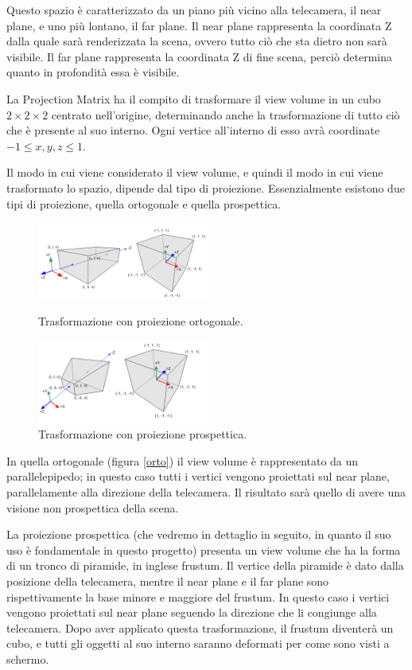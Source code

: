 Questo spazio è caratterizzato da un piano più vicino alla telecamera, il near plane, e uno più lontano, il far plane. Il near plane rappresenta la coordinata Z dalla quale sarà renderizzata la scena, ovvero tutto ciò che sta dietro non sarà visibile. Il far plane rappresenta la coordinata Z di fine scena, perciò determina quanto in profondità essa è visibile.

La Projection Matrix ha il compito di trasformare il view volume in un cubo $2 \times 2\times 2$ centrato nell'origine, determinando anche la trasformazione di tutto ciò che è presente al suo interno. Ogni vertice all'interno di esso avrà coordinate $-1\leq x,y,z \leq 1$.

Il modo in cui viene considerato il view volume, e quindi il modo in cui viene trasformato lo spazio, dipende dal tipo di proiezione. Essenzialmente esistono due tipi di proiezione, quella ortogonale e quella prospettica.

\begin{figure}[htbp]
\centering
\includegraphics[width=0.5\textwidth]{images/frustum/orto-projection.png}
\caption{Trasformazione con proiezione ortogonale.\label{orto}}
\includegraphics[width=0.5\textwidth]{images/frustum/persp-projection.png}
\caption{Trasformazione con proiezione prospettica.\label{persp}}
\end{figure}

In quella ortogonale (figura \ref{orto}) il view volume è rappresentato da un parallelepipedo; in questo caso tutti i vertici vengono proiettati sul near plane, parallelamente alla direzione della telecamera. Il risultato sarà quello di avere una visione non prospettica della scena.

La proiezione prospettica (che vedremo in dettaglio in seguito, in quanto il suo uso è fondamentale in questo progetto) presenta un view volume che ha la forma di un tronco di piramide, in inglese frustum.
Il vertice della piramide è dato dalla posizione della telecamera, mentre il near plane e il far plane sono rispettivamente la base minore e maggiore del frustum. In questo caso i vertici vengono proiettati sul near plane seguendo la direzione che li congiunge alla telecamera. Dopo aver applicato questa trasformazione, il frustum diventerà un cubo, e tutti gli oggetti al suo interno saranno deformati per come sono visti a schermo.

